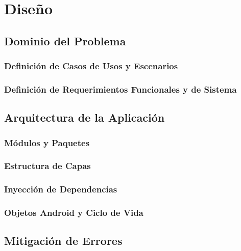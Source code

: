 
\chapter{Diseño} %

\label{Chapter3} %


\section{Dominio del Problema}
\subsection{Definición de Casos de Usos y Escenarios}
\subsection{Definición de Requerimientos Funcionales y de Sistema}
\section{Arquitectura de la Aplicación}
\subsection{Módulos y Paquetes}
\subsection{Estructura de Capas}
\subsection{Inyección de Dependencias}
\subsection{Objetos Android y Ciclo de Vida}
\section{Mitigación de Errores}

